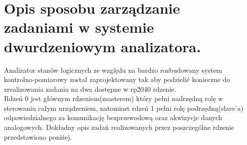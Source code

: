 \section{Opis sposobu zarządzanie zadaniami w systemie dwurdzeniowym analizatora.}

Analizator stanów logicznych ze względu na bardzo rozbudowany system kontrolno-pomiarowy
został zaprojektowany tak aby podzielić konieczne do zrealizowania zadania na dwa dostępne w 
rp2040 rdzenie. \\
Rdzeń 0 jest głównym rdzeniem(masterem) który pełni nadrzędną rolę w sterowaniu całym urządzeniem,
natomiast rdzeń 1 pełni rolę podrzędną(slave'a) odpowiedzialnego za komunikację bezprzewodową oraz akwizycje danych analogowych.
Dokładny opis zadań realizowanych przez poszczególne rdzenie przedstawiono poniżej.

